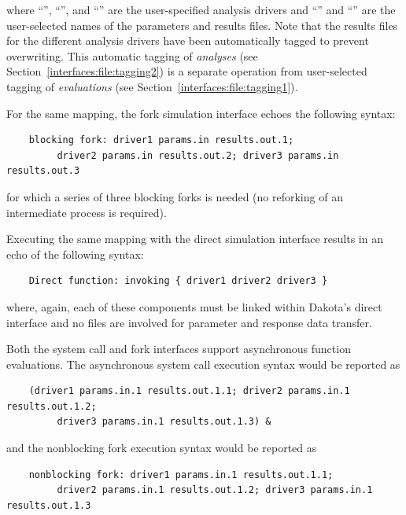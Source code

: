 where ``'', ``'', and
``'' are the user-specified analysis drivers and
``'' and ``'' are the
user-selected names of the parameters and results files. Note that the
results files for the different analysis drivers have been
automatically tagged to prevent overwriting. This automatic tagging of
\emph{analyses} (see Section~\ref{interfaces:file:tagging2}) is a
separate operation from user-selected tagging of \emph{evaluations}
(see Section~\ref{interfaces:file:tagging1}).

For the same mapping, the fork simulation interface echoes the
following syntax:
\begin{small}
\begin{verbatim}
    blocking fork: driver1 params.in results.out.1;
         driver2 params.in results.out.2; driver3 params.in results.out.3
\end{verbatim}
\end{small}

for which a series of three blocking forks is needed (no reforking of
an intermediate process is required).

Executing the same mapping with the direct simulation interface
results in an echo of the following syntax:
\begin{small}
\begin{verbatim}
    Direct function: invoking { driver1 driver2 driver3 }
\end{verbatim}
\end{small}

where, again, each of these components must be linked within Dakota's
direct interface and no files are involved for parameter and response
data transfer.

Both the system call and fork interfaces support asynchronous function
evaluations. The asynchronous system call execution syntax would be
reported as
\begin{small}
\begin{verbatim}
    (driver1 params.in.1 results.out.1.1; driver2 params.in.1 results.out.1.2;
         driver3 params.in.1 results.out.1.3) &
\end{verbatim}
\end{small}

and the nonblocking fork execution syntax would be reported as
\begin{small}
\begin{verbatim}
    nonblocking fork: driver1 params.in.1 results.out.1.1;
         driver2 params.in.1 results.out.1.2; driver3 params.in.1 results.out.1.3
\end{verbatim}
\end{small}

